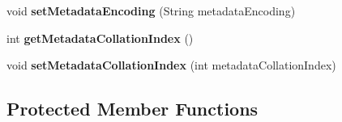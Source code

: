\begin{DoxyCompactItemize}
void {\bfseries set\+Metadata\+Encoding} (String metadata\+Encoding)
\item 
\mbox{\label{classcom_1_1mysql_1_1cj_1_1jdbc_1_1_database_meta_data_a861d145aaa9842ad98ecec5b32c90a10}} 
int {\bfseries get\+Metadata\+Collation\+Index} ()
\item 
\mbox{\label{classcom_1_1mysql_1_1cj_1_1jdbc_1_1_database_meta_data_a7d449201565645e2febe0da0ffef7cd7}} 
void {\bfseries set\+Metadata\+Collation\+Index} (int metadata\+Collation\+Index)
\end{DoxyCompactItemize}
\subsection*{Protected Member Functions}
